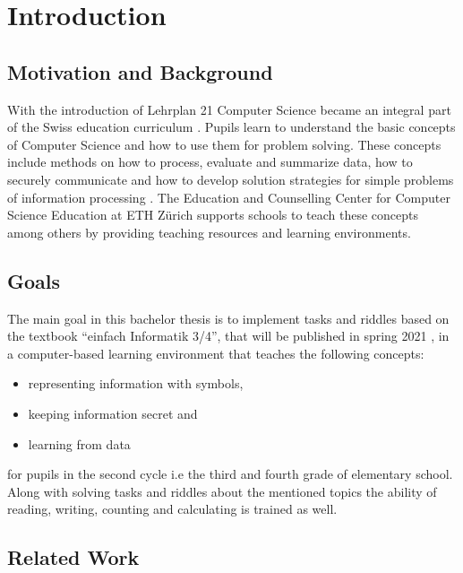 \chapter{Introduction}

\section{Motivation and Background}

With the introduction of Lehrplan 21 Computer Science became an integral part of the Swiss education curriculum \cite{Lehrplan21}. Pupils learn to understand the basic concepts of Computer Science and how to use them for problem solving. These concepts include methods on how to process, evaluate and summarize data, how to securely communicate and how to develop solution strategies for simple problems of information processing \cite{MedienUndInformatik}. The Education and Counselling Center for Computer Science Education at ETH Zürich \cite{ABZ} supports schools to teach these concepts among others by providing teaching resources and learning environments.

\section{Goals}

The main goal in this bachelor thesis is to implement tasks and riddles based on the textbook “einfach Informatik 3/4”, that will be published in spring 2021 \cite{EinfachInformatik}, in a computer-based learning environment that teaches the following concepts:

\begin{itemize}
    \item representing information with symbols,
    \item keeping information secret and
    \item learning from data
\end{itemize}

for pupils in the second cycle i.e the third and fourth grade of elementary school.
Along with solving tasks and riddles about the mentioned topics the ability of reading, writing, counting and calculating is trained as well.

\section{Related Work}


